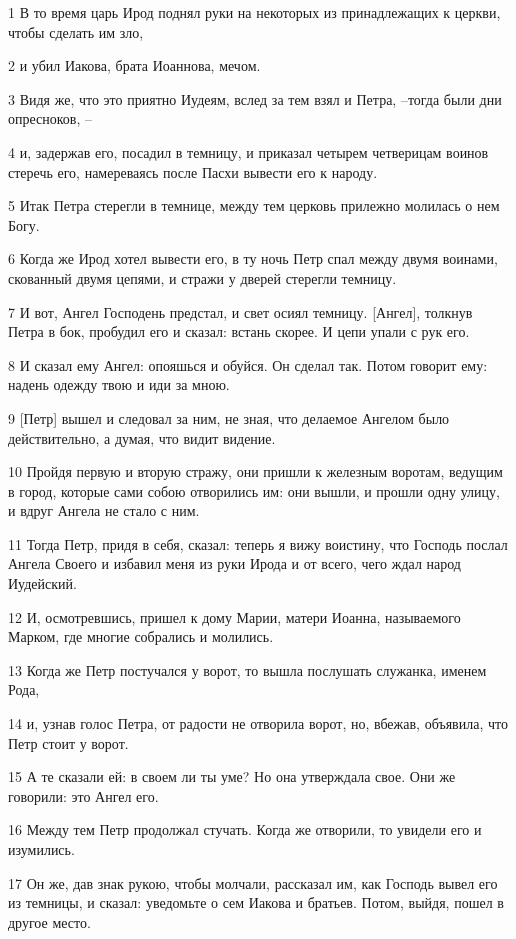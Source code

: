 \par 1 В то время царь Ирод поднял руки на некоторых из принадлежащих к церкви, чтобы сделать им зло,
\par 2 и убил Иакова, брата Иоаннова, мечом.
\par 3 Видя же, что это приятно Иудеям, вслед за тем взял и Петра, --тогда были дни опресноков, --
\par 4 и, задержав его, посадил в темницу, и приказал четырем четверицам воинов стеречь его, намереваясь после Пасхи вывести его к народу.
\par 5 Итак Петра стерегли в темнице, между тем церковь прилежно молилась о нем Богу.
\par 6 Когда же Ирод хотел вывести его, в ту ночь Петр спал между двумя воинами, скованный двумя цепями, и стражи у дверей стерегли темницу.
\par 7 И вот, Ангел Господень предстал, и свет осиял темницу. [Ангел], толкнув Петра в бок, пробудил его и сказал: встань скорее. И цепи упали с рук его.
\par 8 И сказал ему Ангел: опояшься и обуйся. Он сделал так. Потом говорит ему: надень одежду твою и иди за мною.
\par 9 [Петр] вышел и следовал за ним, не зная, что делаемое Ангелом было действительно, а думая, что видит видение.
\par 10 Пройдя первую и вторую стражу, они пришли к железным воротам, ведущим в город, которые сами собою отворились им: они вышли, и прошли одну улицу, и вдруг Ангела не стало с ним.
\par 11 Тогда Петр, придя в себя, сказал: теперь я вижу воистину, что Господь послал Ангела Своего и избавил меня из руки Ирода и от всего, чего ждал народ Иудейский.
\par 12 И, осмотревшись, пришел к дому Марии, матери Иоанна, называемого Марком, где многие собрались и молились.
\par 13 Когда же Петр постучался у ворот, то вышла послушать служанка, именем Рода,
\par 14 и, узнав голос Петра, от радости не отворила ворот, но, вбежав, объявила, что Петр стоит у ворот.
\par 15 А те сказали ей: в своем ли ты уме? Но она утверждала свое. Они же говорили: это Ангел его.
\par 16 Между тем Петр продолжал стучать. Когда же отворили, то увидели его и изумились.
\par 17 Он же, дав знак рукою, чтобы молчали, рассказал им, как Господь вывел его из темницы, и сказал: уведомьте о сем Иакова и братьев. Потом, выйдя, пошел в другое место.
